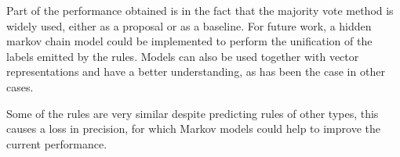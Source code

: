 \documentclass{IEEEtran}
\begin{document}
Part of the performance obtained is in the fact that the majority vote method is widely used, either as a proposal or as a baseline. For future work, a hidden markov chain model could be implemented to perform the unification of the labels emitted by the rules. Models can also be used together with vector representations and have a better understanding, as has been the case in other cases.

Some of the rules are very similar despite predicting rules of other types, this causes a loss in precision, for which Markov models could help to improve the current performance.






\end{document}
